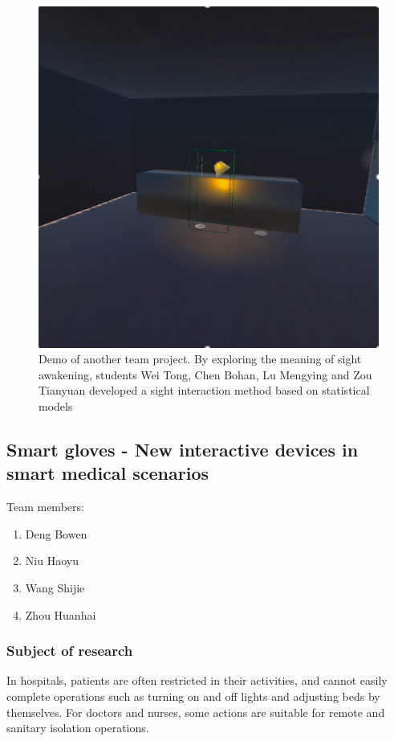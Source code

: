 \begin{figure}
  \centering
  \includegraphics[width=0.9\linewidth]{figures/Project_10.png}
  \caption{Demo of another team project. By exploring the meaning of sight awakening, students Wei Tong, Chen Bohan, Lu Mengying and Zou Tianyuan developed a sight interaction method based on statistical models }
  \label{fig:Project10-figure}
\end{figure}

\subsection{Smart gloves - New interactive devices in smart medical scenarios}

Team members:
\begin{enumerate}
    \item Deng Bowen 
    \item Niu Haoyu
    \item Wang Shijie 
    \item Zhou Huanhai 
\end{enumerate}


\subsubsection{Subject of research}

In hospitals, patients are often restricted in their activities, and cannot easily complete operations such as turning on and off lights and adjusting beds by themselves. For doctors and nurses, some actions are suitable for remote and sanitary isolation operations.

